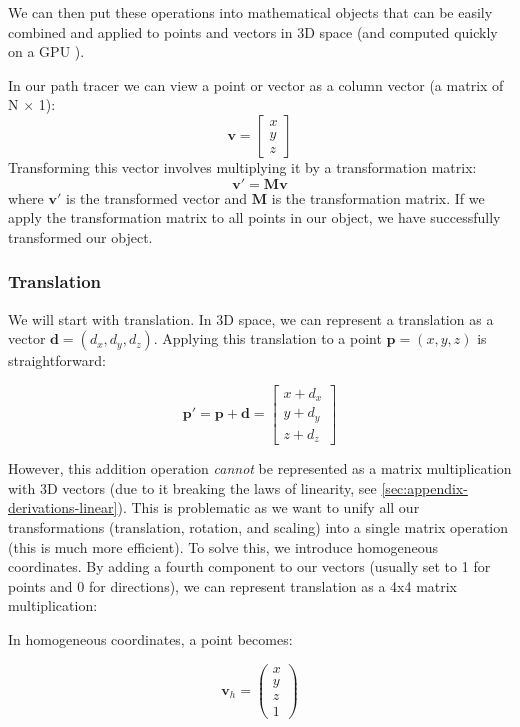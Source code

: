 \documentclass[12pt]{article}
\begin{document}
We can then put these operations into mathematical objects that can be easily combined and applied to points and vectors in 3D space (and computed quickly on a GPU \cite{gpumatrixmultiplication}).

In our path tracer we can view a point or vector as a column vector (a matrix of N $\times$ 1):
\[
    \mathbf{v} = \begin{bmatrix} x \\ y \\ z \end{bmatrix}
\]
Transforming this vector involves multiplying it by a transformation matrix:
\[
    \mathbf{v}' = \mathbf{M} \mathbf{v}
\]
where \(\mathbf{v}'\) is the transformed vector and \(\mathbf{M}\) is the transformation matrix.
If we apply the transformation matrix to all points in our object, we have successfully transformed our object.

\subsubsection{Translation}

We will start with translation. In 3D space, we can represent a translation as a vector $\mathbf{d} = (d_x, d_y, d_z)$. Applying this translation to a point $\mathbf{p} = (x, y, z)$ is straightforward:

$$ \mathbf{p}' = \mathbf{p} + \mathbf{d} = \begin{bmatrix}
        x + d_x \\ y + d_y \\ z + d_z
    \end{bmatrix} $$

However, this addition operation \textit{cannot} be represented as a matrix multiplication with 3D vectors (due to it breaking the laws of linearity, see \autoref{sec:appendix-derivations-linear}). This is problematic as we want to unify all our transformations (translation, rotation, and scaling) into a single matrix operation (this is much more efficient).
To solve this, we introduce homogeneous coordinates. By adding a fourth component to our vectors (usually set to 1 for points and 0 for directions), we can represent translation as a 4x4 matrix multiplication:

In homogeneous coordinates, a point becomes:

\[
    \mathbf{v}_h = \begin{pmatrix} x \\ y \\ z \\ 1 \end{pmatrix}
\]
\end{document}
